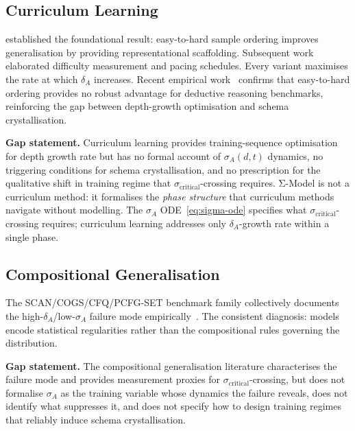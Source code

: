 \documentclass[11pt,a4paper]{article}
\begin{document}
\subsection{Curriculum Learning}\label{sec:curriculum-learning}

\cite{bengio2009curriculumlearning} established the foundational result:
easy-to-hard sample ordering improves generalisation by providing
representational scaffolding. Subsequent work elaborated difficulty
measurement \citep{kumar2010selfpacedlearning,portelas2020automaticcurriculumlearningdeep,
narvekar2020curriculumlearningreinforcementlearning} and pacing schedules.
Every variant maximises the rate at which $\delta_A$ increases.
Recent empirical work~\cite{mordig2026rethinkingeasytohard} confirms
that easy-to-hard ordering provides no robust advantage for
deductive reasoning benchmarks, reinforcing the gap between
depth-growth optimisation and schema crystallisation.

\textbf{Gap statement.} Curriculum learning provides training-sequence
optimisation for depth growth rate but has no formal account of
$\sigma_A(d,t)$ dynamics, no triggering conditions for schema
crystallisation, and no prescription for the qualitative shift in
training regime that $\sigma_{\text{critical}}$-crossing requires. Σ-Model
is not a curriculum method: it formalises the \emph{phase structure} that
curriculum methods navigate without modelling. The
$\sigma_A$ ODE~\eqref{eq:sigma-ode} specifies what
$\sigma_{\text{critical}}$-crossing requires; curriculum learning
addresses only $\delta_A$-growth rate within a single phase.

\subsection{Compositional Generalisation}\label{sec:compositional-generalisation}

The SCAN/COGS/CFQ/PCFG-SET benchmark family collectively documents the
high-$\delta_A$/low-$\sigma_A$ failure mode empirically~\citep{mondorf2026compositionalarc}.
The consistent diagnosis: models encode statistical regularities rather than the
compositional rules governing the distribution.

\textbf{Gap statement.} The compositional generalisation literature
characterises the failure mode and provides measurement proxies for
$\sigma_{\text{critical}}$-crossing, but does not formalise $\sigma_A$
as the training variable whose dynamics the failure reveals, does not
identify what suppresses it, and does not specify how to design training
regimes that reliably induce schema crystallisation.
\end{document}
